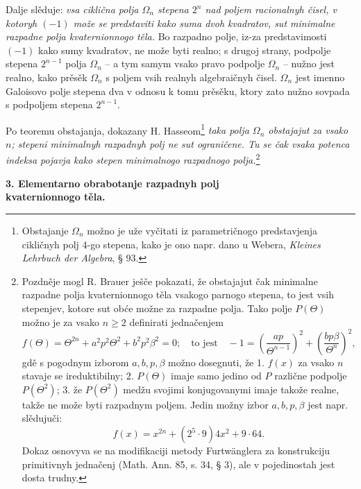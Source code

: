 \documentclass[11pt]{article}
\begin{document}
\noindent Dalje slěduje: \emph{vsa ciklična polja $\Omega_n$ stepena $2^n$ nad poljem racionalnyh čisel, v kotoryh $(-1)$ može se predstaviti kako suma dvoh kvadratov, sut minimalne razpadne polja kvaternionnogo těla.} Bo razpadno polje, iz-za predstavimosti $(-1)$ kako sumy kvadratov, ne može byti realno; s drugoj strany, podpolje stepena $2^{n-1}$ polja $\Omega_n$ -- a tym samym vsako pravo podpolje $\Omega_n$ -- nužno jest realno, kako prěsěk $\Omega_n$ s poljem vsih realnyh algebraičnyh čisel. $\Omega_n$ jest imenno Galoisovo polje stepena dva v odnosu k tomu prěsěku, ktory zato nužno sovpada s podpoljem stepena $2^{n-1}$.

\medskip

\noindent Po teoremu obstajanja, dokazany H. Hasseom\footnote{Obstajanje $\Omega_n$ možno je uže vyčitati iz parametričnogo predstavjenja cikličnyh polj 4-go stepena, kako je ono napr. dano u Webera, \emph{Kleines Lehrbuch der Algebra}, § 93.} \emph{taka polja $\Omega_n$ obstajajut za vsako $n$; stepeni minimalnyh razpadnyh polj ne sut ograničene. Tu se čak vsaka potenca indeksa pojavja kako stepen minimalnogo razpadnogo polja.}\footnote{Pozdněje mogl R. Brauer ješče pokazati, že obstajajut čak minimalne razpadne polja kvaternionnogo těla vsakogo parnogo stepena, to jest vsih stepenjev, kotore sut obće možne za razpadne polja. Tako polje $P(\Theta)$ možno je za vsako $n\ge2$ definirati jednačenjem
\[
 f(\Theta)=\Theta^{2n}+a^2p^2\Theta^2+b^2p^2\beta^2=0;
 \quad \text{to jest}\quad -1=\left(\frac{ap}{\Theta^{n-1}}\right)^2+
       \left(\frac{bp\beta}{\Theta^n}\right)^2,
\]
gdě s pogodnym izborom $a,b,p,\beta$ možno dosegnuti, že 1. $f(x)$ za vsako $n$ stavaje se ireduktibilny; 2. $P(\Theta)$ imaje samo jedino od $P$ različne podpolje $P(\Theta^2)$; 3. že $P(\Theta^2)$ medžu svojimi konjugovanymi imaje takože realne, takže ne može byti razpadnym poljem. Jedin možny izbor $a,b,p,\beta$ jest napr. slědujuči:
\[
        f(x)=x^{2n}+(2^5\cdot9)4x^2+9\cdot64.
\]
Dokaz osnovyva se na modifikaciji metody Furtwänglera za konstrukciju primitivnyh jednačenj (Math. Ann. 85, s. 34, § 3), ale v pojedinostah jest dosta trudny.}

\begin{center}
\textbf{3. Elementarno obrabotanje razpadnyh polj\\
kvaternionnogo těla.}
\end{center}
\end{document}
